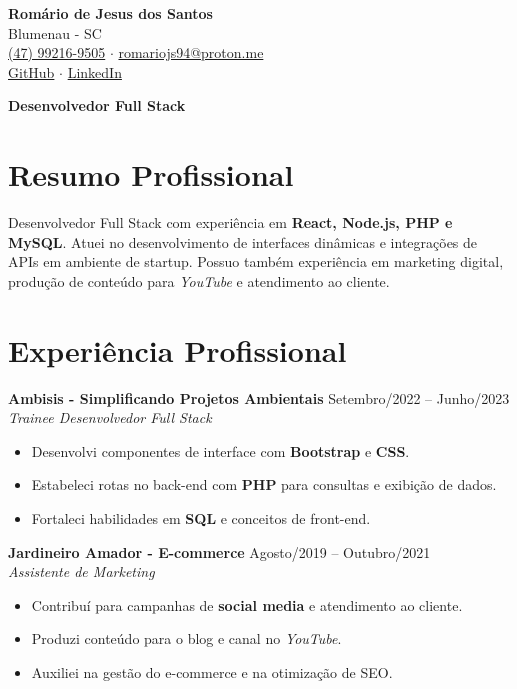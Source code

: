\documentclass[a4paper,10pt]{article}
\begin{document}
\begin{center}
    {\LARGE \textbf{Romário de Jesus dos Santos}} \\[0.2cm]
    Blumenau - SC \\
    \href{tel:+5547992169505}{(47) 99216-9505} $\cdot$ \href{mailto:romariojs94@proton.me}{romariojs94@proton.me} \\[0.1cm]
    \href{https://github.com/romariojs94}{GitHub} $\cdot$ \href{https://linkedin.com/in/romariojs94}{LinkedIn}
\end{center}

\vspace{0.3cm}
\noindent\makebox[\linewidth]{\rule{\textwidth}{0.4pt}}
\begin{center}
    {\Large \textbf{Desenvolvedor Full Stack}}
\end{center}
\noindent\makebox[\linewidth]{\rule{\textwidth}{0.4pt}}
\vspace{0.5cm}

\section*{Resumo Profissional}
Desenvolvedor Full Stack com experiência em \textbf{React, Node.js, PHP e MySQL}. Atuei no desenvolvimento de interfaces dinâmicas e integrações de APIs em ambiente de startup. Possuo também experiência em marketing digital, produção de conteúdo para \textit{YouTube} e atendimento ao cliente.

\section*{Experiência Profissional}
\textbf{Ambisis - Simplificando Projetos Ambientais} \hfill Setembro/2022 – Junho/2023 \\
\textit{Trainee Desenvolvedor Full Stack} 
\begin{itemize}[leftmargin=*]
    \item Desenvolvi componentes de interface com \textbf{Bootstrap} e \textbf{CSS}. 
    \item Estabeleci rotas no back-end com \textbf{PHP} para consultas e exibição de dados.
    \item Fortaleci habilidades em \textbf{SQL} e conceitos de front-end.
\end{itemize}

\textbf{Jardineiro Amador - E-commerce} \hfill Agosto/2019 – Outubro/2021 \\
\textit{Assistente de Marketing} 
\begin{itemize}[leftmargin=*]
    \item Contribuí para campanhas de \textbf{social media} e atendimento ao cliente.
    \item Produzi conteúdo para o blog e canal no \textit{YouTube}.
    \item Auxiliei na gestão do e-commerce e na otimização de SEO.
\end{itemize}
\end{document}
